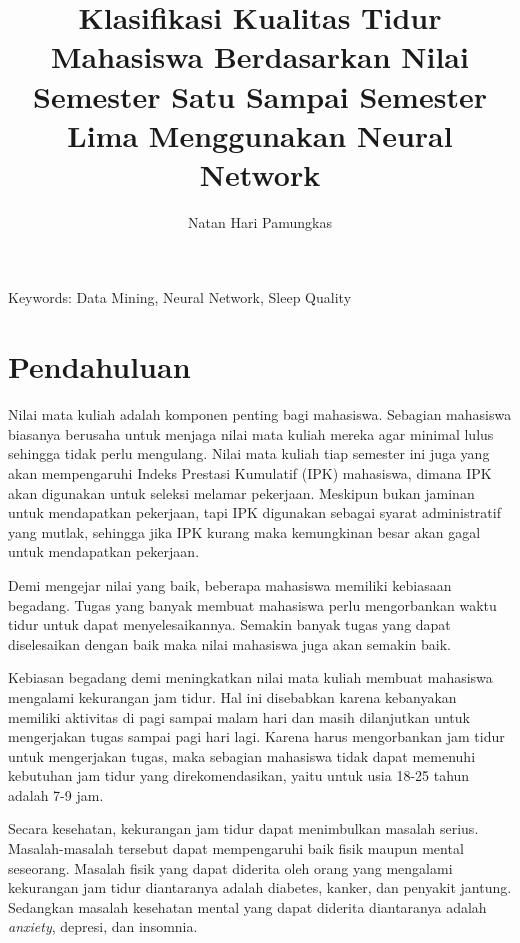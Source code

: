 \documentclass[12pt, a4paper]{article}
\title{Klasifikasi Kualitas Tidur Mahasiswa Berdasarkan Nilai Semester Satu Sampai Semester Lima Menggunakan Neural Network}
\author{Natan Hari Pamungkas}
\date{}
\begin{document}
\maketitle

\begin{abstract}
\end{abstract}

Keywords: Data Mining, Neural Network, Sleep Quality

\section{Pendahuluan}
\begin{multicols}{2}
\justifying
Nilai mata kuliah adalah komponen penting bagi mahasiswa. Sebagian mahasiswa biasanya berusaha untuk menjaga nilai mata kuliah mereka agar minimal lulus sehingga tidak perlu mengulang. Nilai mata kuliah tiap semester ini juga yang akan mempengaruhi Indeks Prestasi Kumulatif (IPK) mahasiswa, dimana IPK akan digunakan untuk seleksi melamar pekerjaan. Meskipun bukan jaminan untuk mendapatkan pekerjaan, tapi IPK digunakan sebagai syarat administratif yang mutlak, sehingga jika IPK
kurang maka kemungkinan besar akan gagal untuk mendapatkan pekerjaan. \cite{Idris.2020}

Demi mengejar nilai yang baik, beberapa mahasiswa memiliki kebiasaan begadang. Tugas yang banyak membuat mahasiswa perlu mengorbankan waktu tidur untuk dapat menyelesaikannya. Semakin banyak tugas yang dapat diselesaikan dengan baik maka nilai mahasiswa juga akan semakin baik. \cite{Nielton.2019}

Kebiasan begadang demi meningkatkan nilai mata kuliah membuat mahasiswa mengalami kekurangan jam tidur. Hal ini disebabkan karena kebanyakan memiliki aktivitas di pagi sampai malam hari dan masih dilanjutkan untuk mengerjakan tugas sampai pagi hari lagi. Karena harus mengorbankan jam tidur untuk mengerjakan tugas, maka sebagian mahasiswa tidak dapat memenuhi kebutuhan jam tidur yang direkomendasikan, yaitu untuk usia 18-25 tahun adalah 7-9 jam. \cite{Hirshkowitz.2015}

Secara kesehatan, kekurangan jam tidur dapat menimbulkan masalah serius. Masalah-masalah tersebut dapat mempengaruhi baik fisik maupun mental seseorang. Masalah fisik yang dapat diderita oleh orang yang mengalami kekurangan jam tidur diantaranya adalah diabetes, kanker, dan penyakit jantung. Sedangkan masalah kesehatan mental yang dapat diderita diantaranya adalah \textit{anxiety}, depresi, dan insomnia. \cite{Berglund.2019}


\end{multicols}
\end{document}
